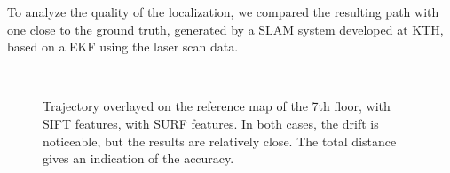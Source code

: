 \clearpage
To analyze the quality of the localization, we compared the resulting path with one close to the ground truth, generated by a \gls{SLAM} system developed at KTH, based on a \gls{EKF} using the laser scan data.
\begin{figure}[H]
\centering
{} \\
\caption{Trajectory overlayed on the reference map of the 7th floor, \protect{} with SIFT features, \protect{} with SURF features. In both cases, the drift is noticeable, but the results are relatively close. The total distance gives an indication of the accuracy.}
\label{fig:plan_cvap}
\end{figure}

